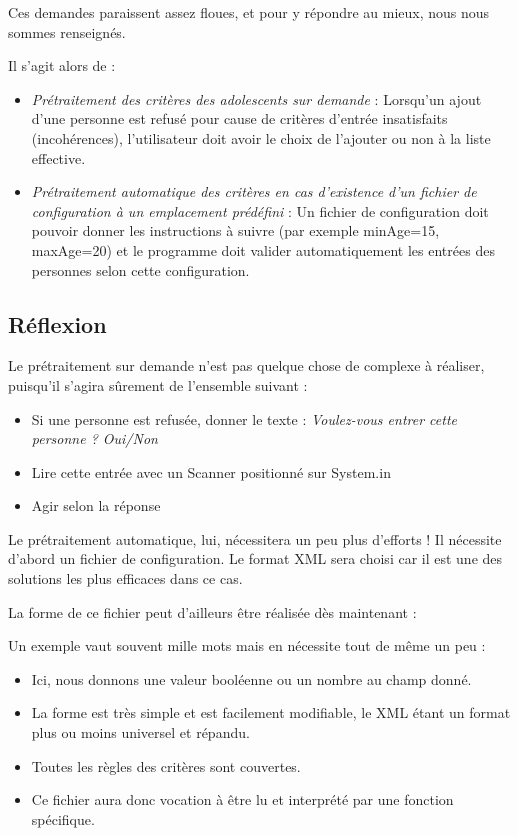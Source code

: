 \documentclass{mytex}
\begin{document}
Ces demandes paraissent assez floues, et pour y répondre au mieux, nous nous sommes renseignés.

Il s'agit alors de : 

\begin{itemize}
	\item \textit{Prétraitement des critères des adolescents sur demande} : Lorsqu'un ajout d'une personne est refusé pour cause de critères d'entrée insatisfaits (incohérences), l'utilisateur doit avoir le choix de l'ajouter ou non à la liste effective.
	\item \textit{Prétraitement automatique des critères en cas d’existence d’un fichier de configuration à un emplacement prédéfini} : Un fichier de configuration doit pouvoir donner les instructions à suivre (par exemple minAge=15, maxAge=20) et le programme doit valider automatiquement les entrées des personnes selon cette configuration.
\end{itemize}

\subsection{Réflexion}

Le prétraitement sur demande n'est pas quelque chose de complexe à réaliser, puisqu'il s'agira sûrement de l'ensemble suivant :

\begin{itemize}
	\item Si une personne est refusée, donner le texte : \textit{Voulez-vous entrer cette personne ? Oui/Non}
	\item Lire cette entrée avec un Scanner positionné sur System.in
	\item Agir selon la réponse
\end{itemize}

Le prétraitement automatique, lui, nécessitera un peu plus d'efforts ! Il nécessite d'abord un fichier de configuration. Le format XML sera choisi car il est une des solutions les plus efficaces dans ce cas.

La forme de ce fichier peut d'ailleurs être réalisée dès maintenant :


Un exemple vaut souvent mille mots mais en nécessite tout de même un peu :

\begin{itemize}
	\item Ici, nous donnons une valeur booléenne ou un nombre au champ donné.
	\item La forme est très simple et est facilement modifiable, le XML étant un format plus ou moins universel et répandu.
	\item Toutes les règles des critères sont couvertes.
	\item Ce fichier aura donc vocation à être lu et interprété par une fonction spécifique.
\end{itemize}
\end{document}
